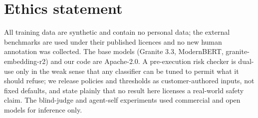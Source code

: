\section*{Ethics statement}

All training data are synthetic and contain no personal data; the external
benchmarks are used under their published licences and no new human
annotation was collected. The base models (Granite 3.3, ModernBERT,
granite-embedding-r2) and our code are Apache-2.0. A pre-execution risk
checker is dual-use only in the weak sense that any classifier can be tuned
to permit what it should refuse; we release policies and thresholds as
customer-authored inputs, not fixed defaults, and state plainly that no
result here licenses a real-world safety claim. The blind-judge and
agent-self experiments used commercial and open models for inference only.
